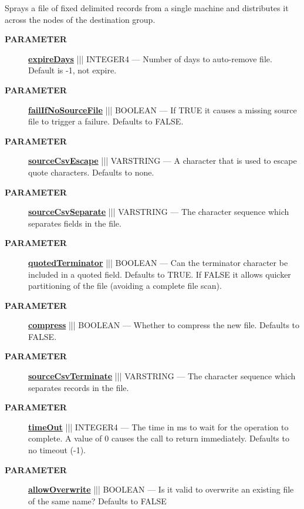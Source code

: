 \par





Sprays a file of fixed delimited records from a single machine and distributes it across the nodes of the destination group.






\par
\begin{description}
\item [\colorbox{tagtype}{\color{white} \textbf{\textsf{PARAMETER}}}] \textbf{\underline{expireDays}} ||| INTEGER4 --- Number of days to auto-remove file. Default is -1, not expire.
\item [\colorbox{tagtype}{\color{white} \textbf{\textsf{PARAMETER}}}] \textbf{\underline{failIfNoSourceFile}} ||| BOOLEAN --- If TRUE it causes a missing source file to trigger a failure. Defaults to FALSE.
\item [\colorbox{tagtype}{\color{white} \textbf{\textsf{PARAMETER}}}] \textbf{\underline{sourceCsvEscape}} ||| VARSTRING --- A character that is used to escape quote characters. Defaults to none.
\item [\colorbox{tagtype}{\color{white} \textbf{\textsf{PARAMETER}}}] \textbf{\underline{sourceCsvSeparate}} ||| VARSTRING --- The character sequence which separates fields in the file.
\item [\colorbox{tagtype}{\color{white} \textbf{\textsf{PARAMETER}}}] \textbf{\underline{quotedTerminator}} ||| BOOLEAN --- Can the terminator character be included in a quoted field. Defaults to TRUE. If FALSE it allows quicker partitioning of the file (avoiding a complete file scan).
\item [\colorbox{tagtype}{\color{white} \textbf{\textsf{PARAMETER}}}] \textbf{\underline{compress}} ||| BOOLEAN --- Whether to compress the new file. Defaults to FALSE.
\item [\colorbox{tagtype}{\color{white} \textbf{\textsf{PARAMETER}}}] \textbf{\underline{sourceCsvTerminate}} ||| VARSTRING --- The character sequence which separates records in the file.
\item [\colorbox{tagtype}{\color{white} \textbf{\textsf{PARAMETER}}}] \textbf{\underline{timeOut}} ||| INTEGER4 --- The time in ms to wait for the operation to complete. A value of 0 causes the call to return immediately. Defaults to no timeout (-1).
\item [\colorbox{tagtype}{\color{white} \textbf{\textsf{PARAMETER}}}] \textbf{\underline{allowOverwrite}} ||| BOOLEAN --- Is it valid to overwrite an existing file of the same name? Defaults to FALSE

\end{description}
